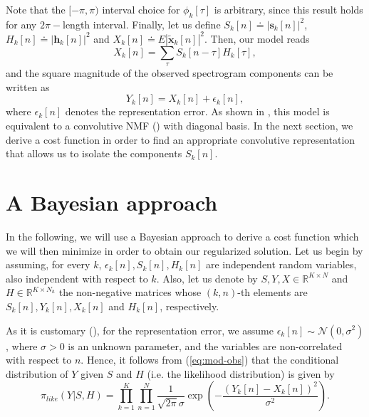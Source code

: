 \documentclass[12pt]{article}
\begin{document}
Note that the $[-\pi,\pi)$ interval choice for $\phi_k[\tau]$ is arbitrary, since this result holds for any $2\pi-$length interval. Finally, let us define $S_k[n] \doteq |\mathbf{s}_k[n]|^2$, $H_k[n] \doteq |\mathbf{h}_k[n]|^2$ and $X_k[n] \doteq E|\tilde{\mathbf{x}}_k[n]|^2$. Then, our model reads
%
\begin{equation} \label{eq:mod-rep}
X_k[n] = \sum_{\tau} S_k[n-\tau] H_k[\tau],
\end{equation}
%
and the square magnitude of the observed spectrogram components can be written as
%
\begin{equation} \label{eq:mod-obs}
Y_k[n] = X_k[n] +\epsilon_k[n],
\end{equation}
%
where $\epsilon_k[n]$ denotes the representation error. As shown in \cite{kameoka2009}, this model is equivalent to a convolutive NMF (\cite{smaragdis2004}) with diagonal basis. In the next section, we derive a cost function in order to find an appropriate convolutive representation that allows us to isolate the components $S_k[n]$.




\section{A Bayesian approach}

In the following, we will use a Bayesian approach to derive a cost function which we will then minimize in order to obtain our regularized solution. Let us begin by assuming, for every $k$,  $\epsilon_k[n], S_k[n], H_k[n]$ are independent random variables, also independent with respect to $k$. Also, let us denote by  $S,Y, X\in \mathbb{R}^{K\times N}$ and $H \in \mathbb{R}^{K\times N_h}$ the non-negative matrices whose $(k,n)$-th elements are $S_k[n],Y_k[n], X_k[n]$ and $H_k[n]$, respectively.

As it is customary  (\cite{kameoka2009}), for the representation error, we assume $\epsilon_k[n] \sim \mathcal{N}(0,\sigma^2)$, where $\sigma>0$ is an unknown parameter, and the variables are non-correlated with respect to $n$. Hence, it follows from (\ref{eq:mod-obs}) that the conditional distribution of $Y$ given $S$ and $H$ (i.e. the likelihood distribution) is given by
%
\begin{equation}
\pi_{like}(Y|S,H) = \prod_{k=1}^K \prod_{n=1}^N  \frac{1}{\sqrt{2\pi}\sigma} \exp \left(-\frac{(Y_k[n] - X_k[n])^2}{\sigma^2}\right). \nonumber
\end{equation}
\end{document}
